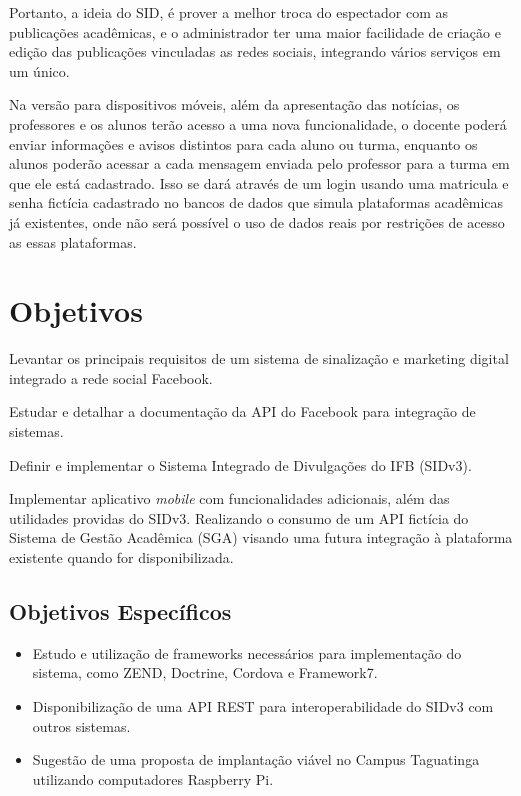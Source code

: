 Portanto, a ideia do SID, é prover a melhor troca do espectador com as publicações acadêmicas, e o administrador ter uma maior facilidade de criação e edição das publicações vinculadas as redes sociais, integrando vários serviços em um único.

Na versão para dispositivos móveis, além da apresentação das notícias, os professores e os alunos terão acesso a uma nova funcionalidade, o docente poderá enviar informações e avisos distintos para cada aluno ou turma, enquanto os alunos poderão acessar a cada mensagem enviada pelo professor para a turma em que ele está cadastrado. Isso se dará através de um login usando uma matricula e senha fictícia cadastrado no bancos de dados que simula plataformas acadêmicas já existentes, onde não será possível o uso de dados reais por restrições de acesso as essas plataformas.

\section{Objetivos}
Levantar os principais requisitos de um sistema de sinalização e marketing digital integrado a rede social Facebook.

Estudar e detalhar a documentação da API do Facebook para integração de sistemas.

Definir e implementar o Sistema Integrado de Divulgações do IFB (SIDv3).

Implementar aplicativo \textit{mobile} com funcionalidades adicionais, além das utilidades providas do SIDv3. Realizando o consumo de um API fictícia do Sistema de Gestão Acadêmica (SGA) visando uma futura integração à plataforma existente quando for disponibilizada.

\subsection{Objetivos Específicos}
	 \begin{itemize}
	\item Estudo e utilização de frameworks necessários para implementação do sistema, como ZEND, Doctrine, Cordova e Framework7.
	 	
	\item Disponibilização de uma API REST para interoperabilidade do SIDv3 com outros sistemas.
	
	\item Sugestão de uma proposta de implantação viável no Campus Taguatinga utilizando computadores Raspberry Pi.
	\end{itemize}
	

